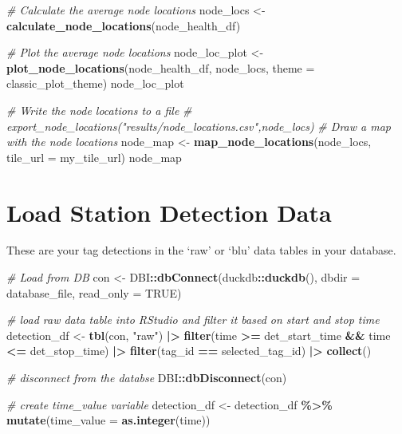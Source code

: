 \documentclass[
]{book}
\newenvironment{Shaded}{\begin{snugshade}}{\end{snugshade}}
\newcommand{\AttributeTok}[1]{\textcolor[rgb]{0.13,0.29,0.53}{#1}}
\newcommand{\CommentTok}[1]{\textcolor[rgb]{0.56,0.35,0.01}{\textit{#1}}}
\newcommand{\ConstantTok}[1]{\textcolor[rgb]{0.56,0.35,0.01}{#1}}
\newcommand{\FunctionTok}[1]{\textcolor[rgb]{0.13,0.29,0.53}{\textbf{#1}}}
\newcommand{\NormalTok}[1]{#1}
\newcommand{\OtherTok}[1]{\textcolor[rgb]{0.56,0.35,0.01}{#1}}
\newcommand{\SpecialCharTok}[1]{\textcolor[rgb]{0.81,0.36,0.00}{\textbf{#1}}}
\newcommand{\StringTok}[1]{\textcolor[rgb]{0.31,0.60,0.02}{#1}}
\begin{document}
\begin{Shaded}
\begin{Highlighting}[]
\CommentTok{\# Calculate the average node locations}
\NormalTok{node\_locs }\OtherTok{\textless{}{-}} \FunctionTok{calculate\_node\_locations}\NormalTok{(node\_health\_df)}

\CommentTok{\# Plot the average node locations}
\NormalTok{node\_loc\_plot }\OtherTok{\textless{}{-}} \FunctionTok{plot\_node\_locations}\NormalTok{(node\_health\_df, }
\NormalTok{                                     node\_locs, }
                                     \AttributeTok{theme =}\NormalTok{ classic\_plot\_theme)}
\NormalTok{node\_loc\_plot}

\CommentTok{\# Write the node locations to a file}
\CommentTok{\# export\_node\_locations("results/node\_locations.csv",node\_locs)}
\CommentTok{\# Draw a map with the node locations}
\NormalTok{node\_map }\OtherTok{\textless{}{-}} \FunctionTok{map\_node\_locations}\NormalTok{(node\_locs, }\AttributeTok{tile\_url =}\NormalTok{ my\_tile\_url)}
\NormalTok{node\_map}
\end{Highlighting}
\end{Shaded}

\section{Load Station Detection Data}\label{load-station-detection-data}

These are your tag detections in the `raw' or `blu' data tables in your database.

\begin{Shaded}
\begin{Highlighting}[]
\CommentTok{\# Load from DB}
\NormalTok{con }\OtherTok{\textless{}{-}}\NormalTok{ DBI}\SpecialCharTok{::}\FunctionTok{dbConnect}\NormalTok{(duckdb}\SpecialCharTok{::}\FunctionTok{duckdb}\NormalTok{(), }\AttributeTok{dbdir =}\NormalTok{ database\_file, }\AttributeTok{read\_only =} \ConstantTok{TRUE}\NormalTok{)}

\CommentTok{\# load raw data table into RStudio and filter it based on start and stop time}
\NormalTok{detection\_df }\OtherTok{\textless{}{-}} \FunctionTok{tbl}\NormalTok{(con, }\StringTok{"raw"}\NormalTok{) }\SpecialCharTok{|\textgreater{}}
  \FunctionTok{filter}\NormalTok{(time }\SpecialCharTok{\textgreater{}=}\NormalTok{ det\_start\_time }\SpecialCharTok{\&\&}\NormalTok{ time }\SpecialCharTok{\textless{}=}\NormalTok{ det\_stop\_time) }\SpecialCharTok{|\textgreater{}}
  \FunctionTok{filter}\NormalTok{(tag\_id }\SpecialCharTok{==}\NormalTok{ selected\_tag\_id) }\SpecialCharTok{|\textgreater{}}
  \FunctionTok{collect}\NormalTok{()}

\CommentTok{\# disconnect from the databse}
\NormalTok{DBI}\SpecialCharTok{::}\FunctionTok{dbDisconnect}\NormalTok{(con)}

\CommentTok{\# create time\_value variable}
\NormalTok{detection\_df }\OtherTok{\textless{}{-}}\NormalTok{ detection\_df }\SpecialCharTok{\%\textgreater{}\%} 
  \FunctionTok{mutate}\NormalTok{(}\AttributeTok{time\_value =} \FunctionTok{as.integer}\NormalTok{(time))}
\end{Highlighting}
\end{Shaded}
\end{document}
